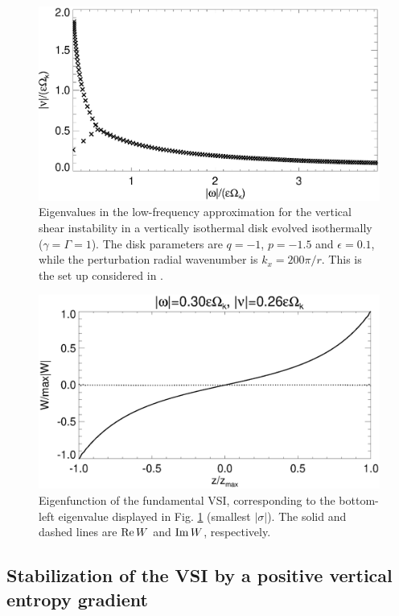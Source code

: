 \begin{figure}
  \includegraphics[width=\linewidth]{figures/eigenvalues_iso}
  \caption{Eigenvalues in the low-frequency approximation for the
    vertical shear instability in a vertically isothermal disk evolved
    isothermally ($\gamma=\Gamma=1$). The disk parameters are $q=-1$,
    $p=-1.5$ and $\epsilon=0.1$, while the perturbation radial
    wavenumber is $k_x=200\pi/r$. This is the set up considered in
    \cite{mcnally14}. \label{lowfreq_eigen}
  }
\end{figure}

\begin{figure}
  \includegraphics[width=\linewidth]{figures/eigenvector_iso}
  \caption{Eigenfunction of the fundamental VSI,
    corresponding to the bottom-left eigenvalue displayed in
    Fig. \ref{lowfreq_eigen} (smallest $|\sigma|$). The
    solid and dashed lines are $\operatorname{Re} W$ and $\operatorname{Im} W$, respectively. 
    \label{lowfreq_eigenfunc}
  }
\end{figure}

\subsection{Stabilization of the VSI by a positive vertical entropy
  gradient}